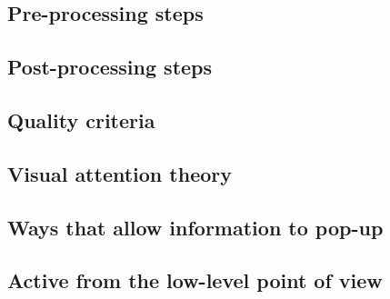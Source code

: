 \documentclass[a4paper]{article}
\begin{document}
\subsection{Pre-processing steps}

\subsection{Post-processing steps}

\subsection{Quality criteria}

\subsection{Visual attention theory}

\subsection{Ways that allow information to pop-up}

\subsection{Active from the low-level point of view}
\end{document}
